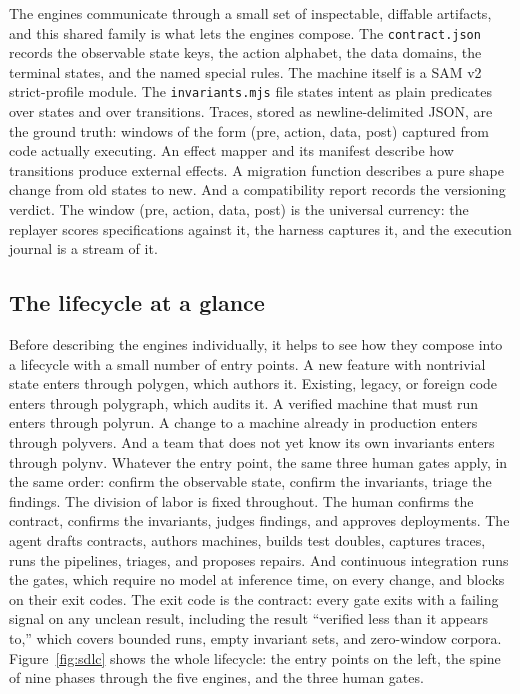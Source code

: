 \documentclass[11pt]{article}
\newcommand{\tool}[1]{\textsf{#1}}
\newcommand{\code}[1]{\texttt{#1}}
\begin{document}
The engines communicate through a small set of inspectable, diffable
artifacts, and this shared family is what lets the engines compose. The
\code{contract.json} records the observable state keys, the action alphabet,
the data domains, the terminal states, and the named special rules. The
machine itself is a SAM v2 strict-profile module. The \code{invariants.mjs}
file states intent as plain predicates over states and over transitions.
Traces, stored as newline-delimited JSON, are the ground truth: windows of the
form (pre, action, data, post) captured from code actually executing. An effect
mapper and its manifest describe how transitions produce external effects. A
migration function describes a pure shape change from old states to new. And a
compatibility report records the versioning verdict. The window (pre, action,
data, post) is the universal currency: the replayer scores specifications
against it, the harness captures it, and the execution journal is a stream of
it.

\subsection{The lifecycle at a glance}

Before describing the engines individually, it helps to see how they compose
into a lifecycle with a small number of entry points. A new feature with
nontrivial state enters through \tool{polygen}, which authors it. Existing,
legacy, or foreign code enters through \tool{polygraph}, which audits it. A
verified machine that must run enters through \tool{polyrun}. A change to a
machine already in production enters through \tool{polyvers}. And a team that
does not yet know its own invariants enters through \tool{polynv}. Whatever the
entry point, the same three human gates apply, in the same order: confirm the
observable state, confirm the invariants, triage the findings. The division of
labor is fixed throughout. The human confirms the contract, confirms the
invariants, judges findings, and approves deployments. The agent drafts
contracts, authors machines, builds test doubles, captures traces, runs the
pipelines, triages, and proposes repairs. And continuous integration runs the
gates, which require no model at inference time, on every change, and blocks on
their exit codes. The exit code is the contract: every gate exits with a
failing signal on any unclean result, including the result ``verified less than
it appears to,'' which covers bounded runs, empty invariant sets, and
zero-window corpora. Figure~\ref{fig:sdlc} shows the whole lifecycle: the entry
points on the left, the spine of nine phases through the five engines, and the
three human gates.
\end{document}
